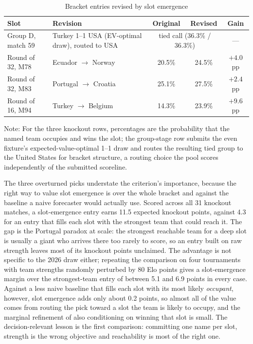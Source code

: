 \documentclass[11pt,letterpaper]{article}
\begin{document}
\begin{table}[htpb!]
  \centering
  \caption{Bracket entries revised by slot emergence}\label{tab:revisions}
  \begin{small}
  \begin{threeparttable}
    {\begin{tabular*}{\textwidth}{@{\extracolsep{\fill}} llccc}
      \toprule
      Slot & Revision & Original & Revised & Gain \\
      \midrule
      Group D, match 59 & Turkey 1--1 USA (EV-optimal draw), routed to USA & \multicolumn{2}{c}{tied call (36.3\% / 36.3\%)} & --- \\
      Round of 32, M78 & Ecuador $\to$ Norway & 20.5\% & 24.5\% & $+4.0$ pp \\
      Round of 32, M83 & Portugal $\to$ Croatia & 25.1\% & 27.5\% & $+2.4$ pp \\
      Round of 16, M94 & Turkey $\to$ Belgium & 14.3\% & 23.9\% & $+9.6$ pp \\
      \bottomrule
    \end{tabular*}}
    \begin{tablenotes}\notesize
      \item Note: For the three knockout rows, percentages are the probability that the named team occupies and wins the slot; the group-stage row submits the even fixture's expected-value-optimal 1--1 draw and routes the resulting tied group to the United States for bracket structure, a routing choice the pool scores independently of the submitted scoreline.
    \end{tablenotes}
  \end{threeparttable}
  \end{small}
\end{table}

The three overturned picks understate the criterion's importance, because the right way to value slot emergence is over the whole bracket and against the baseline a naive forecaster would actually use. Scored across all 31 knockout matches, a slot-emergence entry earns 11.5 expected knockout points, against 4.3 for an entry that fills each slot with the strongest team that could reach it. The gap is the Portugal paradox at scale: the strongest reachable team for a deep slot is usually a giant who arrives there too rarely to score, so an entry built on raw strength leaves most of its knockout points unclaimed. The advantage is not specific to the 2026 draw either; repeating the comparison on four tournaments with team strengths randomly perturbed by 80 Elo points gives a slot-emergence margin over the strongest-team entry of between 5.1 and 6.9 points in every case. Against a less naive baseline that fills each slot with its most likely \emph{occupant}, however, slot emergence adds only about 0.2 points, so almost all of the value comes from routing the pick toward a slot the team is likely to occupy, and the marginal refinement of also conditioning on winning that slot is small. The decision-relevant lesson is the first comparison: committing one name per slot, strength is the wrong objective and reachability is most of the right one.
\end{document}

